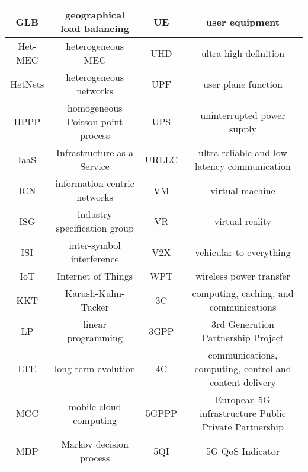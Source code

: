 \documentclass[journal]{IEEEtran}
\begin{document}
\begin{table*}
{{\begin{tabular}{cc|cc}
    \hline
      GLB & geographical load balancing  &  UE & user equipment \\
    \hline
       Het-MEC& heterogeneous MEC & UHD  &  ultra-high-definition    \\
    \hline
       HetNets & heterogeneous networks &  UPF & user plane function    \\
    \hline
       HPPP & homogeneous Poisson point process &   UPS & uninterrupted power supply     \\
    \hline
      IaaS & Infrastructure as a Service &   URLLC & ultra-reliable and low latency communication \\
    \hline
    ICN  &  information-centric networks &   VM  &  virtual machine   \\
    \hline
    ISG & industry specification group  & VR & virtual reality \\
    \hline
     ISI &  inter-symbol interference &  V2X & vehicular-to-everything \\
      \hline
     IoT  & Internet of Things   &  WPT & wireless power transfer  \\
    \hline
     KKT & Karush-Kuhn-Tucker &  3C &  computing, caching, and communications  \\
    \hline
      LP & linear programming  & 3GPP & 3rd Generation Partnership Project \\
    \hline
    LTE &  long-term evolution  &  4C & communications, computing, control and content delivery \\
    \hline
    MCC  &  mobile cloud computing  & 5GPPP & European 5G
infrastructure Public Private Partnership\\
   \hline
    MDP & Markov decision process   & 5QI & 5G QoS Indicator \\
    \hline
  \end{tabular}}}
\end{table*}
\end{document}
